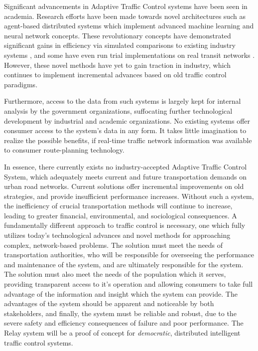 \documentclass[a4paper,11pt]{report}
\begin{document}
\begin{multicols}{2}
Significant advancements in Adaptive Traffic Control systems have been seen in academia.
Research efforts have been made towards novel architectures such as agent-based distributed systems which implement advanced machine learning and neural network concepts.
These revolutionary concepts have demonstrated significant gains in efficiency via simulated comparisons to existing industry systems \cite{1688100, 5073360, uot-article}, and some have even run trial implementations on real transit networks \cite{uot-article}.
However, these novel methods have yet to gain traction in industry, which continues to implement incremental advances based on old traffic control paradigms.

Furthermore, access to the data from such systems is largely kept for internal analysis by the government organizations, suffocating further technological development by industrial and academic organizations.
No existing systems offer consumer access to the system's data in any form.
It takes little imagination to realize the possible benefits, if real-time traffic network information was available to consumer route-planning technology.

In essence, there currently exists no industry-accepted Adaptive Traffic Control System, which adequately meets current and future transportation demands on urban road networks.
Current solutions offer incremental improvements on old strategies, and provide insufficient performance increases.
Without such a system, the inefficiency of crucial transportation methods will continue to increase, leading to greater financial, environmental, and sociological consequences.
A fundamentally different approach to traffic control is necessary, one which fully utilizes today's technological advances and novel methods for approaching complex, network-based problems.
The solution must meet the needs of transportation authorities, who will be responsible for overseeing the performance and maintenance of the system, and are ultimately responsible for the system.
The solution must also meet the needs of the population which it serves, providing transparent access to it's operation and allowing consumers to take full advantage of the information and insight which the system can provide.
The advantages of the system should be apparent and noticeable by both stakeholders, and finally, the system must be reliable and robust, due to the severe safety and efficiency consequences of failure and poor performance. The Relay system will be a proof of concept for \emph{democratic}, distributed intelligent traffic control systems.


\end{multicols}
\end{document}
